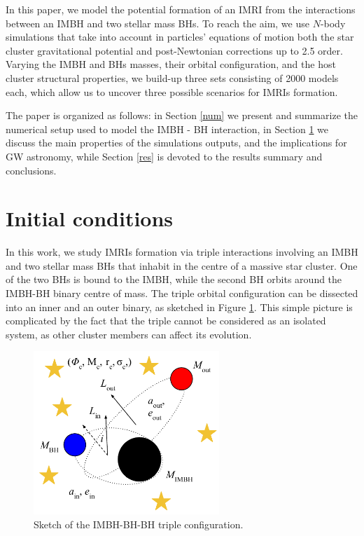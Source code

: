 \documentclass[useAMS,usenatbib]{mn2e}
\begin{document}
In this paper, we model the potential formation of an IMRI from the
interactions between an IMBH and two stellar mass BHs. To reach the aim, we use
$N$-body simulations that take into account in particles' equations of motion
both the star cluster gravitational potential and post-Newtonian corrections up
to 2.5 order. Varying the IMBH and BHs masses, their orbital configuration, and
the host cluster structural properties, we build-up three sets consisting of
2000 models each, which allow us to uncover three possible scenarios for IMRIs
formation. 

The paper is organized as follows: in Section \ref{num} we present and
summarize the numerical setup used to model the IMBH - BH interaction, in
Section \ref{met} we discuss the main properties of the simulations outputs,
and the implications for GW astronomy, while Section \ref{res} is devoted to
the results summary and conclusions. 


\section{Initial conditions} \label{met}

In this work, we study IMRIs formation via triple interactions involving an
IMBH and two stellar mass BHs that inhabit in the centre of a massive star
cluster.  One of the two BHs is bound to the IMBH, while the second BH orbits
around the IMBH-BH binary centre of mass. The triple orbital configuration can
be dissected into an inner and an outer binary, as sketched in Figure
\ref{fig:f1}. This simple picture is complicated by the fact that the triple
cannot be considered as an isolated system, as other cluster members can affect
its evolution.

\begin{figure}
    \centering
    \includegraphics[width=7cm]{triple}
    \caption{Sketch of the IMBH-BH-BH triple configuration.}
    \label{fig:f1}
\end{figure}
\end{document}
